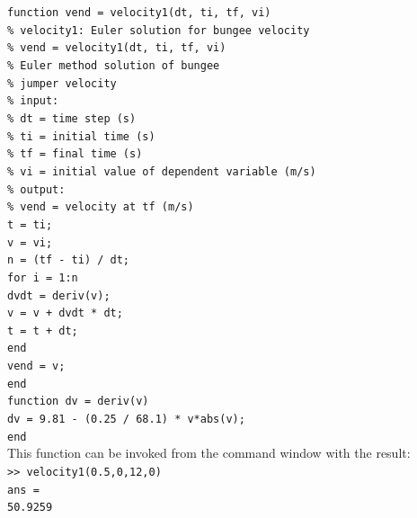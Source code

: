 \documentclass[../main.tex]{subfiles}
\begin{document}
\texttt{function vend = velocity1(dt, ti, tf, vi)\\
\indent \% velocity1: Euler solution for bungee velocity\\
\indent \% \hspace{2mm}vend = velocity1(dt, ti, tf, vi)\\
\indent \% \indent\indent Euler method solution of bungee\\
\indent \% \indent\indent jumper velocity\\
\indent \% input:\\
\indent \% \hspace{2mm}dt = time step (s)\\
\indent \% \hspace{2mm}ti = initial time (s)\\
\indent \% \hspace{2mm}tf = final time (s)\\
\indent \% \hspace{2mm}vi = initial value of dependent variable (m/s)\\
\indent \% output:\\
\indent \% \hspace{2mm}vend = velocity at tf (m/s)\\
\indent t = ti;\\
\indent v = vi;\\
\indent n = (tf - ti) / dt;\\
\indent for i = 1:n\\
\indent \hspace{2mm}dvdt = deriv(v);\\
\indent \hspace{2mm}v = v + dvdt * dt;\\
\indent \hspace{2mm}t = t + dt;\\
\indent end\\
\indent vend = v;\\
\indent end\\
\indent function dv = deriv(v)\\
\indent dv = 9.81 - (0.25 / 68.1) * v*abs(v);\\
\indent end}\\

\noindent This function can be invoked from the command window with the result:\\

\texttt{>> velocity1(0.5,0,12,0)\\
\indent ans =\\
\indent\hspace{2mm} 50.9259}\\
\end{document}
